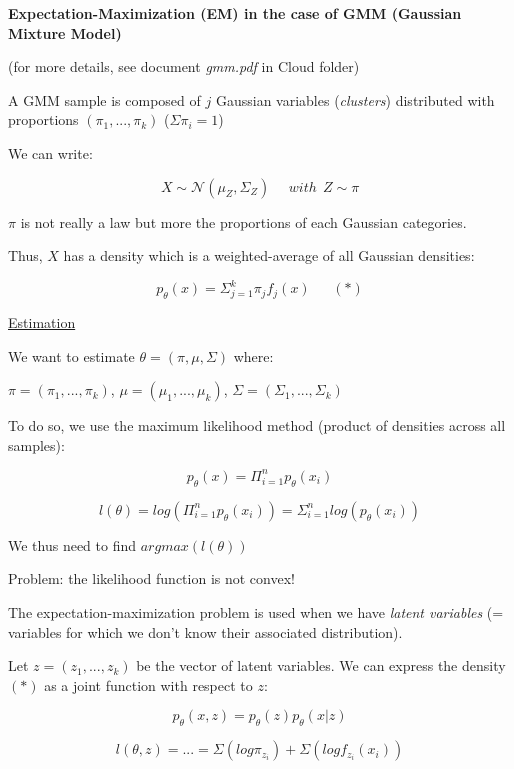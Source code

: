 {\fontsize{12pt}{22pt} \textbf{Expectation-Maximization (EM) in the case of GMM (Gaussian Mixture Model)}\par}

\vspace{5mm}

(for more details, see document \textit{gmm.pdf} in Cloud folder)

\vspace{5mm}

A GMM sample is composed of $j$ Gaussian variables (\textit{clusters}) distributed with proportions $(\pi_1,...,\pi_k)$ ($\Sigma \pi_i =1$)

We can write:

$$X \sim \mathcal{N}(\mu_{Z},\Sigma_{Z})~~~~~~with~~Z \sim \pi$$

$\pi$ is not really a law but more the proportions of each Gaussian categories.

Thus, $X$ has a density which is a weighted-average of all Gaussian densities:

$$p_\theta(x) = \Sigma_{j=1}^{k}\pi_j f_j(x)~~~~~~~(*)$$


\underline{Estimation}

We want to estimate $\theta = (\pi, \mu, \Sigma)$ where:

$\pi=(\pi_1,...,\pi_k)$, $\mu=(\mu_1,...,\mu_k)$, $\Sigma=(\Sigma_1,...,\Sigma_k)$

\vspace{5mm}

To do so, we use the maximum likelihood method (product of densities across all samples):

$$p_\theta(x)=\Pi_{i=1}^n p_\theta(x_i)$$

$$l(\theta)=log(\Pi_{i=1}^n p_\theta(x_i))=\Sigma_{i=1}^n log(p_\theta(x_i))$$

We thus need to find $argmax(l(\theta))$

Problem: the likelihood function is not convex!

\vspace{5mm}

The expectation-maximization problem is used when we have \textit{latent variables} (= variables for which we don't know their associated distribution).

Let $z=(z_1,...,z_k)$ be the vector of latent variables. We can express the density $(*)$ as a joint function with respect to $z$:

$$p_\theta(x,z)=p_\theta(z)p_\theta(x|z)$$

$$l(\theta, z) = ... =\Sigma(log \pi_{z_i})+ \Sigma(logf_{z_i}(x_i))$$

